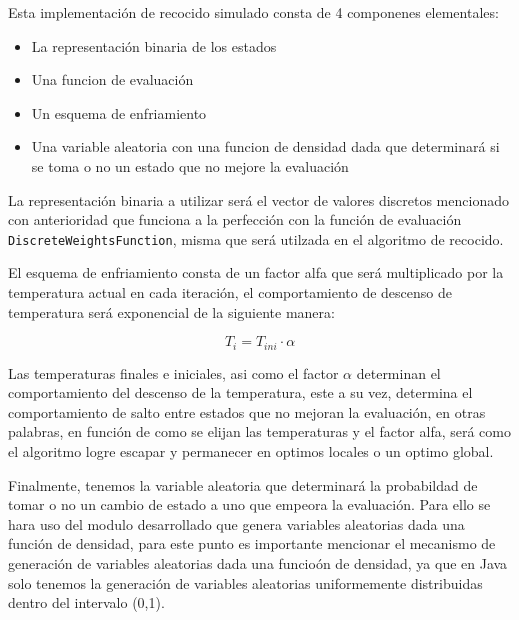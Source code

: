\documentclass{article}
\begin{document}
	Esta implementación de recocido simulado consta de 4 componenes elementales:
\begin{itemize}
		\item La representación binaria de los estados
		\item Una funcion de evaluación
		\item Un esquema de enfriamiento
		\item Una variable aleatoria con una funcion de densidad dada que determinará si se toma o no un estado que no mejore la evaluación
\end{itemize}
	La representación binaria a utilizar será el vector de valores discretos mencionado con anterioridad que funciona a la perfección con la función de evaluación \texttt{DiscreteWeightsFunction}, misma 
	que será utilzada en el algoritmo de recocido.

	El esquema de enfriamiento consta de un factor alfa que será multiplicado por la temperatura actual en cada iteración, el comportamiento de descenso de temperatura será exponencial de la siguiente manera:

\begin{equation*}
			T_i = T_{ini} \cdot \alpha
\end{equation*}

	Las temperaturas finales e iniciales, asi como el factor $\alpha$ determinan el comportamiento del descenso de la temperatura, este a su vez, determina el comportamiento de salto entre estados que no mejoran 
	la evaluación, en otras palabras, en función de como se elijan las temperaturas y el factor alfa, será como el algoritmo logre escapar y permanecer en optimos locales o un optimo global.

	Finalmente, tenemos la variable aleatoria que determinará la probabildad de tomar o no un cambio de estado a uno que empeora la evaluación. Para ello se hara uso del modulo desarrollado que genera variables
	aleatorias dada una función de densidad, para este punto es importante mencionar el mecanismo de generación de variables aleatorias dada una funcioón de densidad, ya que en Java solo tenemos la generación de 
	variables aleatorias uniformemente distribuidas dentro del intervalo (0,1).
\end{document}
